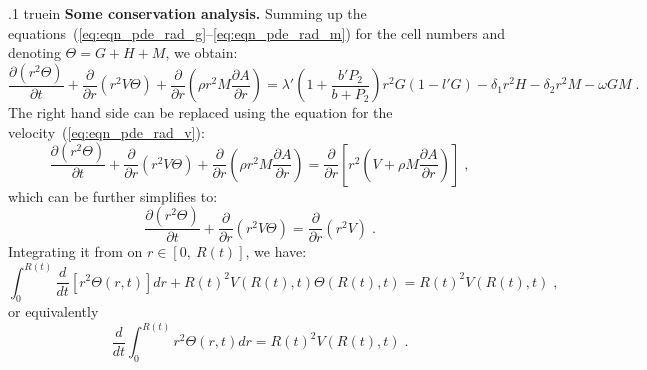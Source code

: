 \documentclass{amsart}
\theoremstyle{definition}
\theoremstyle{remark}
\numberwithin{equation}{section}
\numberwithin{figure}{section}
\newcommand{\po}[1]{\frac{\partial}{\partial{#1}}}
\newcommand{\pp}[2]{\frac{\partial {#1}}{\partial {#2}}}
\begin{document}
{\color{blue}
\vglue .1 truein
\noindent
{\bf Some conservation analysis.}
Summing up the equations~(\ref{eq:eqn_pde_rad_g}--\ref{eq:eqn_pde_rad_m}) for the cell numbers and denoting $\Theta=G+H+M$, we obtain:
\begin{displaymath}
  \pp{(r^2\Theta)}{t} + \po{r}\left(r^2V\Theta\right) + \po{r}\left(\rho r^2M\pp{A}{r}\right) = \lambda'\left(1+\frac{b'P_2}{b+P_2}\right) r^2G(1-l'G)-\delta_1r^2H - \delta_2r^2M - \omega GM\;.
\end{displaymath}
The right hand side can be replaced using the equation for the velocity~(\ref{eq:eqn_pde_rad_v}):
\begin{displaymath}
\pp{(r^2\Theta)}{t} + \po{r}\left(r^2V\Theta\right) + \po{r}\left(\rho r^2M\pp{A}{r}\right) = \po{r}\left[r^2\left(V+\rho M\pp{A}{r}\right)\right]\;,
\end{displaymath}
which can be further simplifies to:
\begin{displaymath}
\pp{(r^2\Theta)}{t} + \po{r}\left(r^2V\Theta\right) = \po{r}\left(r^2V\right)\;.
\end{displaymath}
Integrating it from on $r\in[0,\ R(t)]$, we have:
\begin{displaymath}
\int_0^{R(t)}\frac{d}{dt}\left[r^2\Theta(r,t)\right]dr + R(t)^2V(R(t),t)\Theta(R(t),t) = R(t)^2V(R(t),t)\;,
\end{displaymath}
or equivalently
\begin{displaymath}
\frac{d}{dt}\int_0^{R(t)}r^2\Theta(r,t)dr = R(t)^2V(R(t),t)\;.
\end{displaymath}
}
\end{document}
